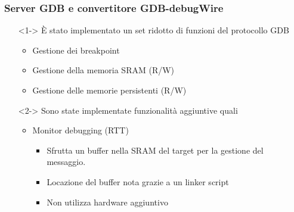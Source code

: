 \documentclass[aspectratio=169,
]{beamer}
\begin{document}
    \begin{frame}
        \frametitle{Server GDB e convertitore GDB-debugWire}
        \begin{itemize}
            \item[] <1-> È stato implementato un set ridotto di funzioni del protocollo GDB
            \begin{itemize}
                \item <1-> Gestione dei breakpoint
                \item <1-> Gestione della memoria SRAM (R/W)
                \item <1-> Gestione delle memorie persistenti (R/W)
            \end{itemize}
            \item[] <2-> Sono state implementate funzionalità aggiuntive quali
            \begin{itemize}
                \item <2-> Monitor debugging (RTT)
                \begin{itemize}\normalfont
                    \item<2-> Sfrutta un buffer nella SRAM del target per la gestione del messaggio. 
                    \item<3-> Locazione del buffer nota grazie a un linker script
                    \item<4-> Non utilizza hardware aggiuntivo
                \end{itemize}
            \end{itemize}
        \end{itemize}
    \end{frame}
\end{document}
